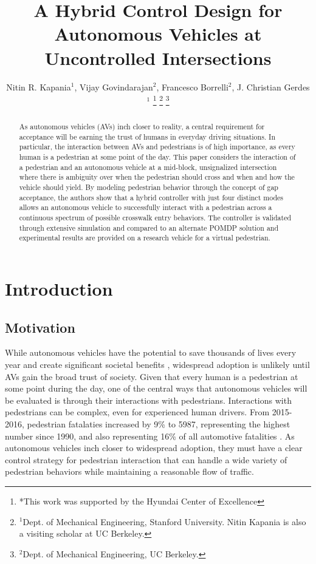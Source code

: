 \documentclass[letterpaper, 10 pt, conference]{ieeeconf} %
\title{\LARGE \bf
A Hybrid Control Design for Autonomous Vehicles at Uncontrolled Intersections}
\author{Nitin R. Kapania$^{1}$, Vijay Govindarajan$^{2}$, Francesco Borrelli$^{2}$, J. Christian Gerdes$^{1}$%
\thanks{*This work was supported by the Hyundai Center of Excellence}%
\thanks{$^{1}$Dept. of Mechanical Engineering, Stanford University. Nitin Kapania is also a visiting scholar at UC Berkeley.}%
\thanks{$^{2}$Dept. of Mechanical Engineering, UC Berkeley.}%
}
\begin{document}
\maketitle
\thispagestyle{empty}
\pagestyle{empty}


\begin{abstract}

As autonomous vehicles (AVs) inch closer to reality, a central requirement for acceptance will be earning the trust of humans in everyday driving situations. In particular, the interaction between AVs and pedestrians is of
high importance, as every human is a pedestrian at some point of the day. This paper considers the interaction of a pedestrian and an autonomous vehicle at a mid-block, unsignalized intersection where there is ambiguity
over when the pedestrian should cross and when and how the vehicle should yield. By modeling pedestrian behavior through the concept of gap acceptance, the authors show that a hybrid controller with just four distinct modes allows an autonomous vehicle to successfully interact with a pedestrian across a continuous spectrum of possible crosswalk entry behaviors. The controller is validated through extensive simulation and compared to an alternate POMDP solution and experimental results are provided on a research vehicle for a virtual pedestrian. 

\end{abstract}


\section{Introduction}

\subsection{Motivation}

While autonomous vehicles have the potential to save thousands of lives every year and create significant societal benefits \cite{Fagnant2015}, widespread adoption is unlikely until AVs gain the broad trust of society. Given that every human is a pedestrian at some point during the day, one of the central ways that autonomous vehicles will be evaluated is through their interactions with pedestrians. Interactions with pedestrians can be complex, even for experienced human drivers. From 2015-2016, pedestrian fatalaties increased by 9\% to 5987, representing the highest number since 1990, and also representing 16\% of all automotive fatalities \cite{HighwayTrafficSafetyAdministration2016}. As autonomous vehicles inch closer to widespread adoption, they must have a clear control strategy for pedestrian interaction that can handle a wide variety of pedestrian behaviors while maintaining a reasonable flow of traffic.  
\end{document}
